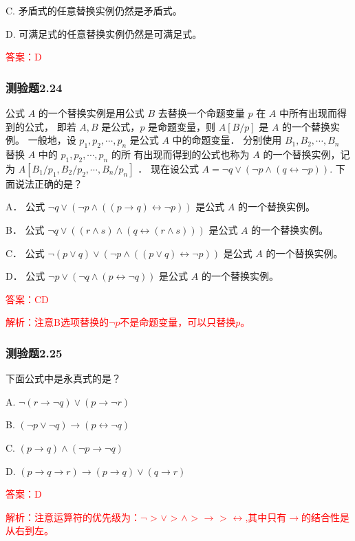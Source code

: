 \documentclass[UTF8, heading=true]{ctexart}
\begin{document}
C. 矛盾式的任意替换实例仍然是矛盾式。

D. 可满足式的任意替换实例仍然是可满足式。

\textcolor{red}{答案：D}

\subsubsection{测验题2.24}

公式 $A$ 的一个替换实例是用公式 $B$ 去替换一个命题变量 $p$ 在 $A$ 中所有出现而得到的公式，
即若 $A, B$ 是公式，$p$ 是命题变量，则 $A[B / p]$ 是 $A$ 的一个替换实例。
一般地，设 $p_1, p_2, \cdots, p_n$ 是公式 $A$ 中的命题变量．
分别使用 $B_1, B_2, \cdots, B_n$ 替换 $A$ 中的 $p_1, p_2, \cdots, p_n$ 的所
有出现而得到的公式也称为 $A$ 的一个替换实例，记为 $A\left[B_1 / p_1, B_2 / p_2, \cdots, B_n / p_n\right]$ ．
现在设公式 $A=\neg q \vee(\neg p \wedge(q \leftrightarrow \neg p))$.
 下面说法正确的是？

A．
公式 $\neg q \vee(\neg p \wedge((p \rightarrow q) \leftrightarrow \neg p))$ 是公式 $A$ 的一个替换实例。

B．
公式 $\neg q \vee((r \wedge s) \wedge(q \leftrightarrow(r \wedge s)))$ 是公式 $A$ 的一个替换实例。

C．
公式 $\neg(p \vee q) \vee(\neg p \wedge((p \vee q) \leftrightarrow \neg p))$ 是公式 $A$ 的一个替换实例。

D．
公式 $\neg p \vee(\neg q \wedge(p \leftrightarrow \neg q))$ 是公式 $A$ 的一个替换实例。


\textcolor{red}{答案：CD}

\textcolor{red}{解析：注意B选项替换的$\neg p$不是命题变量，可以只替换$p$。}

\subsubsection{测验题2.25}

下面公式中是永真式的是？

A. $ \neg(r \rightarrow \neg q) \vee(p \rightarrow \neg r)$

B. $(\neg p \vee \neg q) \rightarrow(p \leftrightarrow \neg q)$

C. $(p \rightarrow q) \wedge(\neg p \rightarrow \neg q)$

D. $(p \rightarrow q \rightarrow r) \rightarrow(p \rightarrow q) \vee(q \rightarrow r)$

\textcolor{red}{答案：D}

\textcolor{red}{解析：注意运算符的优先级为：$\neg$ >  $\vee$ > $\wedge$ > $\rightarrow$ > $\leftrightarrow$,其中只有$\rightarrow$的结合性是从右到左。}
\end{document}
